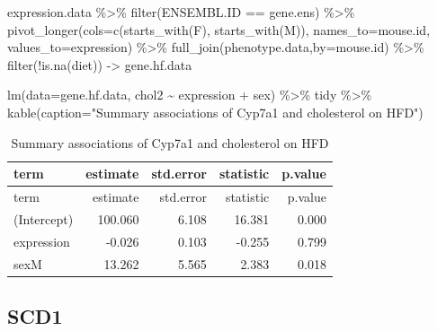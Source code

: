 \documentclass[
]{article}
\newenvironment{Shaded}{\begin{snugshade}}{\end{snugshade}}
\newcommand{\AttributeTok}[1]{\textcolor[rgb]{0.77,0.63,0.00}{#1}}
\newcommand{\FunctionTok}[1]{\textcolor[rgb]{0.00,0.00,0.00}{#1}}
\newcommand{\NormalTok}[1]{#1}
\newcommand{\OtherTok}[1]{\textcolor[rgb]{0.56,0.35,0.01}{#1}}
\newcommand{\SpecialCharTok}[1]{\textcolor[rgb]{0.00,0.00,0.00}{#1}}
\newcommand{\StringTok}[1]{\textcolor[rgb]{0.31,0.60,0.02}{#1}}
\begin{document}
\begin{Shaded}
\begin{Highlighting}[]
\NormalTok{expression.data }\SpecialCharTok{\%\textgreater{}\%}
  \FunctionTok{filter}\NormalTok{(ENSEMBL.ID }\SpecialCharTok{==}\NormalTok{ gene.ens) }\SpecialCharTok{\%\textgreater{}\%}
  \FunctionTok{pivot\_longer}\NormalTok{(}\AttributeTok{cols=}\FunctionTok{c}\NormalTok{(}\FunctionTok{starts\_with}\NormalTok{(}\StringTok{\textquotesingle{}F\textquotesingle{}}\NormalTok{),}
                      \FunctionTok{starts\_with}\NormalTok{(}\StringTok{\textquotesingle{}M\textquotesingle{}}\NormalTok{)),}
               \AttributeTok{names\_to=}\StringTok{\textquotesingle{}mouse.id\textquotesingle{}}\NormalTok{,}
               \AttributeTok{values\_to=}\StringTok{\textquotesingle{}expression\textquotesingle{}}\NormalTok{) }\SpecialCharTok{\%\textgreater{}\%}
  \FunctionTok{full\_join}\NormalTok{(phenotype.data,}\AttributeTok{by=}\StringTok{\textquotesingle{}mouse.id\textquotesingle{}}\NormalTok{) }\SpecialCharTok{\%\textgreater{}\%}
  \FunctionTok{filter}\NormalTok{(}\SpecialCharTok{!}\FunctionTok{is.na}\NormalTok{(diet)) }\OtherTok{{-}\textgreater{}}\NormalTok{ gene.hf.data}

\FunctionTok{lm}\NormalTok{(}\AttributeTok{data=}\NormalTok{gene.hf.data, chol2 }\SpecialCharTok{\textasciitilde{}}\NormalTok{ expression }\SpecialCharTok{+}\NormalTok{ sex) }\SpecialCharTok{\%\textgreater{}\%}
\NormalTok{  tidy }\SpecialCharTok{\%\textgreater{}\%}
  \FunctionTok{kable}\NormalTok{(}\AttributeTok{caption=}\StringTok{"Summary associations of Cyp7a1 and cholesterol on HFD"}\NormalTok{)}
\end{Highlighting}
\end{Shaded}

\begin{longtable}[]{@{}lrrrr@{}}
\caption{Summary associations of Cyp7a1 and cholesterol on
HFD}\tabularnewline
\toprule()
term & estimate & std.error & statistic & p.value \\
\midrule()
\endfirsthead
\toprule()
term & estimate & std.error & statistic & p.value \\
\midrule()
\endhead
(Intercept) & 100.060 & 6.108 & 16.381 & 0.000 \\
expression & -0.026 & 0.103 & -0.255 & 0.799 \\
sexM & 13.262 & 5.565 & 2.383 & 0.018 \\
\bottomrule()
\end{longtable}

\hypertarget{scd1}{%
\subsection{SCD1}\label{scd1}}
\end{document}
